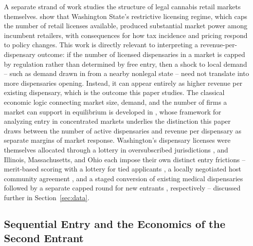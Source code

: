 \documentclass[12pt]{article}
\begin{document}
A separate strand of work studies the structure of legal cannabis retail markets themselves.
\citet{HollenbeckUetake2021} show that Washington State's restrictive licensing regime, which caps the
number of retail licenses available, produced substantial market power among incumbent retailers, with
consequences for how tax incidence and pricing respond to policy changes. This work is directly relevant to
interpreting a revenue-per-dispensary outcome: if the number of licensed dispensaries in a market is capped
by regulation rather than determined by free entry, then a shock to local demand -- such as demand drawn in
from a nearby nonlegal state -- need not translate into more dispensaries opening. Instead, it can appear
entirely as higher revenue per existing dispensary, which is the outcome this paper studies. The classical
economic logic connecting market size, demand, and the number of firms a market can support in equilibrium
is developed in \citet{BresnahanReiss1991}, whose framework for analyzing entry in concentrated markets
underlies the distinction this paper draws between the number of active dispensaries and revenue per
dispensary as separate margins of market response. Washington's dispensary licenses were themselves
allocated through a lottery in oversubscribed jurisdictions
\citep{WSLCB2014LotteryPR,DongTyndall2024,ThomasTian2021}, and Illinois, Massachusetts, and Ohio each impose
their own distinct entry frictions -- merit-based scoring with a lottery for tied applicants
\citep{IDFPRAdultUseCannabis}, a locally negotiated host community agreement \citep{MACCCLicensing}, and a
staged conversion of existing medical dispensaries followed by a separate capped round for new entrants
\citep{OhioDCCFAQ}, respectively -- discussed further in Section~\ref{sec:data}.

\subsection{Sequential Entry and the Economics of the Second Entrant}
\label{sec:lit_sequential}
\end{document}
